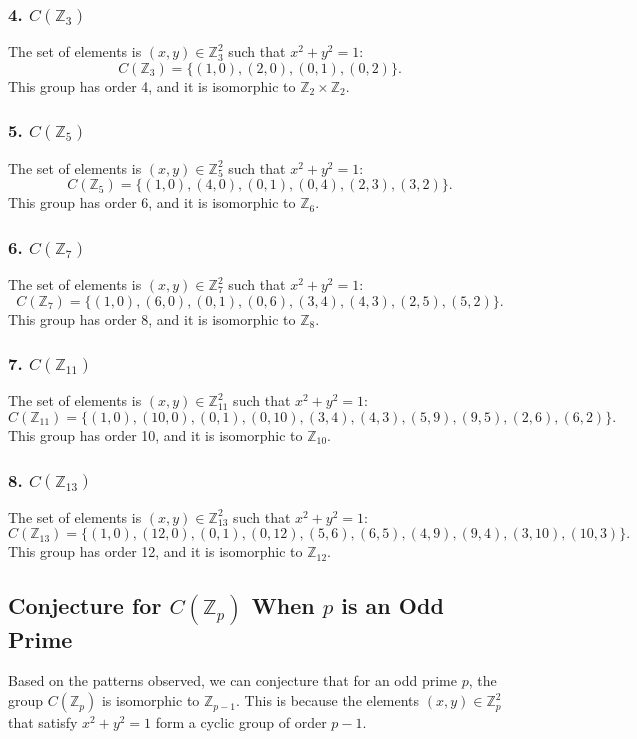 \documentclass[12pt]{amsart}
\theoremstyle{definition}
\numberwithin{equation}{section}
\newcommand{\Z}{\mathbb{Z}}
\begin{document}
\begin{exercise}{9}
    \subsubsection*{4. \(C(\Z_3)\)}
    The set of elements is \((x, y) \in \Z_3^2\) such that \(x^2 + y^2 = 1\):
    \[
    C(\Z_3) = \{(1, 0), (2, 0), (0, 1), (0, 2)\}.
    \]
    This group has order 4, and it is isomorphic to \(\Z_2 \times \Z_2\).

    \subsubsection*{5. \(C(\Z_5)\)}
    The set of elements is \((x, y) \in \Z_5^2\) such that \(x^2 + y^2 = 1\):
    \[
    C(\Z_5) = \{(1, 0), (4, 0), (0, 1), (0, 4), (2, 3), (3, 2)\}.
    \]
    This group has order 6, and it is isomorphic to \(\Z_6\).

    \subsubsection*{6. \(C(\Z_7)\)}
    The set of elements is \((x, y) \in \Z_7^2\) such that \(x^2 + y^2 = 1\):
    \[
    C(\Z_7) = \{(1, 0), (6, 0), (0, 1), (0, 6), (3, 4), (4, 3), (2, 5), (5, 2)\}.
    \]
    This group has order 8, and it is isomorphic to \(\Z_8\).

    \subsubsection*{7. \(C(\Z_{11})\)}
    The set of elements is \((x, y) \in \Z_{11}^2\) such that \(x^2 + y^2 = 1\):
    \[
    C(\Z_{11}) = \{(1, 0), (10, 0), (0, 1), (0, 10), (3, 4), (4, 3), (5, 9), (9, 5), (2, 6), (6, 2)\}.
    \]
    This group has order 10, and it is isomorphic to \(\Z_{10}\).

    \subsubsection*{8. \(C(\Z_{13})\)}
    The set of elements is \((x, y) \in \Z_{13}^2\) such that \(x^2 + y^2 = 1\):
    \[
    C(\Z_{13}) = \{(1, 0), (12, 0), (0, 1), (0, 12), (5, 6), (6, 5), (4, 9), (9, 4), (3, 10), (10, 3)\}.
    \]
    This group has order 12, and it is isomorphic to \(\Z_{12}\).

    \subsection*{Conjecture for \(C(\Z_p)\) When \(p\) is an Odd Prime}

    Based on the patterns observed, we can conjecture that for an odd prime \(p\), the group \(C(\Z_p)\) is isomorphic to \(\Z_{p-1}\). This is because the elements \((x, y) \in \Z_p^2\) that satisfy \(x^2 + y^2 = 1\) form a cyclic group of order \(p-1\).

\end{exercise}
\newpage
\end{document}
